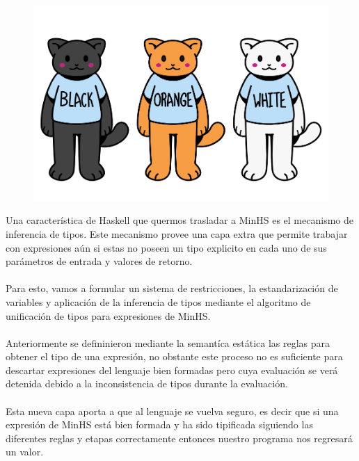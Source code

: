 
\begin{figure}[htbp]
    \centerline{\includegraphics[scale=0.5]{assets/gatitos_tipados.PNG}}       
\end{figure}

Una característica de \textsf{Haskell} que quermos trasladar a \textsf{MinHS} es el mecanismo de inferencia de tipos. Este mecanismo provee una capa extra que permite trabajar con expresiones aún si estas no poseen un tipo explicito en cada uno de sus parámetros de entrada y valores de retorno. \\\\
Para esto, vamos a formular un sistema de restricciones, la estandarización de variables y aplicación de la inferencia de tipos mediante el algoritmo de unificación de tipos para expresiones de \textsf{MinHS}.\\\\
Anteriormente se defininieron mediante la semantíca estática las reglas para obtener el tipo de una expresión, no obstante este proceso no es suficiente para descartar expresiones del lenguaje bien formadas pero cuya evaluación se verá detenida debido a la inconsistencia de tipos durante la evaluación.\\\\
Esta nueva capa aporta a que al lenguaje se vuelva seguro, es decir que si una expresión de \textsf{MinHS} está bien formada y ha sido tipificada siguiendo las diferentes reglas y etapas correctamente entonces nuestro programa nos regresará un valor.\\

